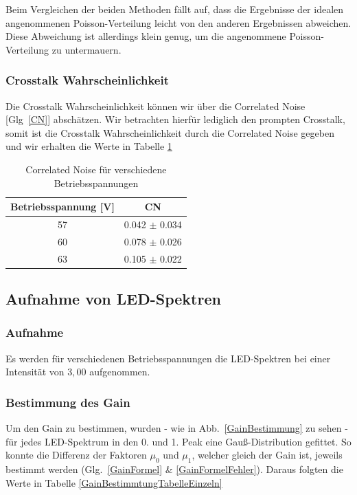 \documentclass[12pt]{article}
\begin{document}
Beim Vergleichen der beiden Methoden fällt auf, dass die Ergebnisse der idealen angenommenen Poisson-Verteilung leicht von den anderen Ergebnissen abweichen. Diese Abweichung ist allerdings klein genug, um die angenommene Poisson-Verteilung zu untermauern.

\subsubsection{Crosstalk Wahrscheinlichkeit}
Die Crosstalk Wahrscheinlichkeit können wir über die Correlated Noise [Glg~\ref{CN}] abschätzen.
Wir betrachten hierfür lediglich den prompten Crosstalk, somit ist die Crosstalk Wahrscheinlichkeit durch die Correlated Noise gegeben und wir erhalten die Werte in Tabelle \ref{CorrelatedNoide}

\begin{table}[h]
  \begin{center}
    \begin{tabular}{|c|c|}
      \hline
      Betriebsspannung [V] & CN \\
      \hline
      57 & 0.042 $\pm$ 0.034 \\
      60 & 0.078 $\pm$ 0.026 \\
      63 & 0.105 $\pm$ 0.022 \\
      \hline
    \end{tabular}
    \caption{Correlated Noise für verschiedene Betriebsspannungen}
    \label{CorrelatedNoide}
  \end{center}
\end{table}

\subsection{Aufnahme von LED-Spektren}

\subsubsection{Aufnahme}
Es werden für verschiedenen Betriebsspannungen die LED-Spektren bei einer Intensität von $3,00$ aufgenommen.


\subsubsection{Bestimmung des Gain}
Um den Gain zu bestimmen, wurden - wie in Abb.~\ref{GainBestimmung} zu sehen - für jedes LED-Spektrum in den 0. und 1. Peak eine Gauß-Distribution gefittet. So konnte die Differenz der Faktoren $\mu_{0}$ und $\mu_{1}$, welcher gleich der Gain ist, jeweils bestimmt werden (Glg.~\ref{GainFormel} \& \ref{GainFormelFehler}). Daraus folgten die Werte in Tabelle \ref{GainBestimmtungTabelleEinzeln}
\end{document}
